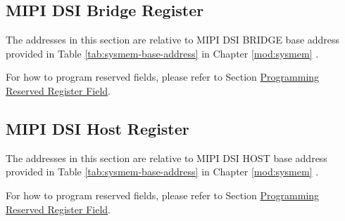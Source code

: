 \documentclass[main\_\_EN.tex]{subfiles}
\begin{document}
\subsection{MIPI DSI Bridge Register}
The addresses in this section are relative to MIPI DSI BRIDGE base address provided in Table \ref{tab:sysmem-base-address} in Chapter \ref{mod:sysmem} \textit{}.

For how to program reserved fields, please refer to Section \hyperref[programming-reserved-field]{Programming Reserved Register Field}.



\subsection{MIPI DSI Host Register}
The addresses in this section are relative to MIPI DSI HOST base address provided in Table \ref{tab:sysmem-base-address} in Chapter \ref{mod:sysmem} \textit{}.

For how to program reserved fields, please refer to Section \hyperref[programming-reserved-field]{Programming Reserved Register Field}.


\end{document}
